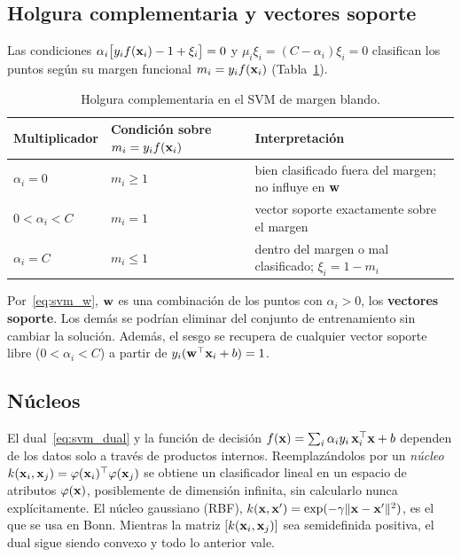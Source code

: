 \subsection{Holgura complementaria y vectores soporte}

Las condiciones $\alpha_i\big[y_i f(\mathbf{x}_i) - 1 + \xi_i\big] = 0$ y $\mu_i\xi_i = (C - \alpha_i)\xi_i = 0$ clasifican los
puntos según su margen funcional $m_i = y_i f(\mathbf{x}_i)$ (Tabla~\ref{tab:svm_kkt}).

\begin{table}[ht]
\centering
\caption{Holgura complementaria en el SVM de margen blando.}
\label{tab:svm_kkt}
\begin{tabular}{lll}
\toprule
Multiplicador & Condición sobre $m_i = y_i f(\mathbf{x}_i)$ & Interpretación \\
\midrule
$\alpha_i = 0$       & $m_i \ge 1$ & bien clasificado fuera del margen; no influye en $\mathbf{w}$ \\
$0 < \alpha_i < C$   & $m_i = 1$   & vector soporte exactamente sobre el margen \\
$\alpha_i = C$       & $m_i \le 1$ & dentro del margen o mal clasificado; $\xi_i = 1 - m_i$ \\
\bottomrule
\end{tabular}
\end{table}

Por~\eqref{eq:svm_w}, $\mathbf{w}$ es una combinación de los puntos con $\alpha_i > 0$, los \textbf{vectores soporte}. Los
demás se podrían eliminar del conjunto de entrenamiento sin cambiar la solución. Además, el sesgo se recupera de
cualquier vector soporte libre ($0 < \alpha_i < C$) a partir de $y_i(\mathbf{w}^\top\mathbf{x}_i + b) = 1$.

\subsection{Núcleos}

El dual~\eqref{eq:svm_dual} y la función de decisión $f(\mathbf{x}) = \sum_i\alpha_i y_i\,\mathbf{x}_i^\top\mathbf{x} + b$ dependen de los
datos solo a través de productos internos. Reemplazándolos por un \emph{núcleo} $k(\mathbf{x}_i, \mathbf{x}_j) = \varphi(\mathbf{x}_i)^\top\varphi(\mathbf{x}_j)$
se obtiene un clasificador lineal en un espacio de atributos $\varphi(\mathbf{x})$, posiblemente de dimensión infinita,
sin calcularlo nunca explícitamente. El núcleo gaussiano (RBF), $k(\mathbf{x}, \mathbf{x}') = \exp(-\gamma\lVert\mathbf{x} - \mathbf{x}'\rVert^2)$,
es el que se usa en Bonn. Mientras la matriz $[k(\mathbf{x}_i, \mathbf{x}_j)]$ sea semidefinida positiva, el dual sigue siendo
convexo y todo lo anterior vale.

